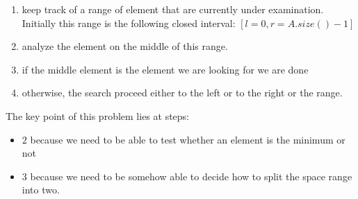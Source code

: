 \begin{enumerate}
	\item keep track of a range of element that are currently under examination. Initially this range is the following closed interval: $[l=0, r=A.size()-1]$
	\item analyze the element on the middle of this range.
	\item if the middle element is the element we are looking for we are done
	\item otherwise, the search proceed either to the left or to the right or the range. 
\end{enumerate}
The key point of this problem lies at steps:
\begin{itemize}
	\item $2$ because we need to be able to test whether an element is the minimum or not
	\item $3$ because we need to be somehow able to decide how to split the space range into two.
\end{itemize}


